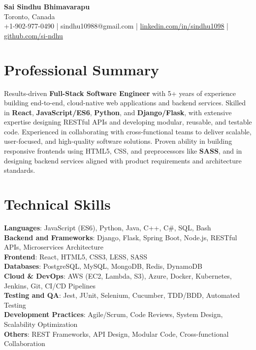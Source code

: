 \documentclass[letterpaper,11pt]{article}
\begin{document}
\begin{center}
  {\Large \textbf{Sai Sindhu Bhimavarapu}} \\
  Toronto, Canada \\
  +1-902-977-0490 \enspace | \enspace sindhu10988@gmail.com \enspace | \enspace \href{https://www.linkedin.com/in/sindhu1098/}{linkedin.com/in/sindhu1098} \enspace | \enspace \href{https://github.com/si-ndhu}{github.com/si-ndhu}
\end{center}

\section{Professional Summary}
  \begin{itemize}[leftmargin=0.15in, label={}]
    \small{\item{
     Results-driven \textbf{Full-Stack Software Engineer} with 5+ years of experience building end-to-end, cloud-native web applications and backend services. Skilled in \textbf{React}, \textbf{JavaScript/ES6}, \textbf{Python}, and \textbf{Django/Flask}, with extensive expertise designing RESTful APIs and developing modular, reusable, and testable code. Experienced in collaborating with cross-functional teams to deliver scalable, user-focused, and high-quality software solutions. Proven ability in building responsive frontends using HTML5, CSS, and preprocessors like \textbf{SASS}, and in designing backend services aligned with product requirements and architecture standards.
    }}
  \end{itemize}
\vspace{-16pt}

\section{Technical Skills}
 \begin{itemize}[leftmargin=0.15in, label={}]
    \small{\item{
     \textbf{Languages}: JavaScript (ES6), Python, Java, C++, C\#, SQL, Bash \\
     \textbf{Backend and Frameworks}: Django, Flask, Spring Boot, Node.js, RESTful APIs, Microservices Architecture \\
     \textbf{Frontend}: React, HTML5, CSS3, LESS, SASS \\
     \textbf{Databases}: PostgreSQL, MySQL, MongoDB, Redis, DynamoDB \\
     \textbf{Cloud & DevOps}: AWS (EC2, Lambda, S3), Azure, Docker, Kubernetes, Jenkins, Git, CI/CD Pipelines \\
     \textbf{Testing and QA}: Jest, JUnit, Selenium, Cucumber, TDD/BDD, Automated Testing \\
     \textbf{Development Practices}: Agile/Scrum, Code Reviews, System Design, Scalability Optimization \\
     \textbf{Others}: REST Frameworks, API Design, Modular Code, Cross-functional Collaboration
    }}
 \end{itemize}
\vspace{-16pt}
\end{document}
